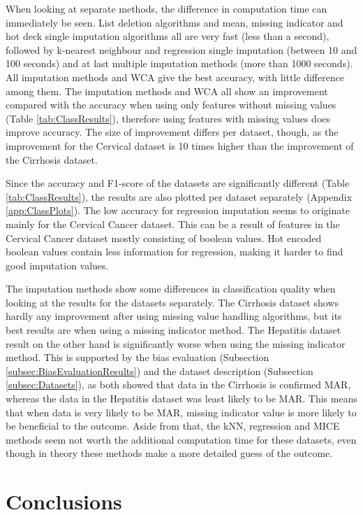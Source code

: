 \documentclass[10pt,a4paper]{article}
\begin{document}
	When looking at separate methods, the difference in computation time can immediately be seen. List deletion algorithms and mean, missing indicator and hot deck single imputation algorithms all are very fast (less than a second), followed by k-nearest neighbour and regression single imputation (between 10 and 100 seconds) and at last multiple imputation methods (more than 1000 seconds). All imputation methods and WCA give the best accuracy, with little difference among them. The imputation methods and WCA all show an improvement compared with the accuracy when using only features without missing values (Table \ref{tab:ClassResults}), therefore using features with missing values does improve accuracy. The size of improvement differs per dataset, though, as the improvement for the Cervical dataset is 10 times higher than the improvement of the Cirrhosis dataset. 
	
	Since the accuracy and F1-score of the datasets are significantly different (Table \ref{tab:ClassResults}), the results are also plotted per dataset separately (Appendix \ref{app:ClassPlots}). The low accuracy for regression imputation seems to originate mainly for the Cervical Cancer dataset. This can be a result of features in the Cervical Cancer dataset mostly consisting of boolean values. Hot encoded boolean values contain less information for regression, making it harder to find good imputation values. 
	
	The imputation methods show some differences in classification quality when looking at the results for the datasets separately. The Cirrhosis dataset shows hardly any improvement after using missing value handling algorithms, but its best results are when using a missing indicator method. The Hepatitis dataset result on the other hand is significantly worse when using the missing indicator method. This is supported by the bias evaluation (Subsection \ref{subsec:BiasEvaluationResults}) and the dataset description (Subsection \ref{subsec:Datasets}), as both showed that data in the Cirrhosis is confirmed MAR, whereas the data in the Hepatitis dataset was least likely to be MAR. This means that when data is very likely to be MAR, missing indicator value is more likely to be beneficial to the outcome. Aside from that, the kNN, regression and MICE methods seem not worth the additional computation time for these datasets, even though in theory these methods make a more detailed guess of the outcome. 
	
	\section{Conclusions}
	\label{sec:Conclusions}
	
\end{document}
